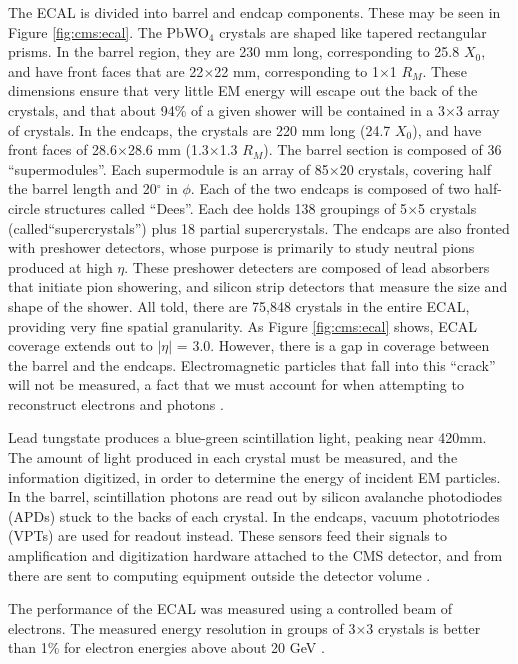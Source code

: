 The ECAL is divided into barrel and endcap components.
These may be seen in Figure \ref{fig:cms:ecal}.
The PbWO$_4$ crystals are shaped like tapered rectangular prisms. In
the barrel region, they are 230 mm long, corresponding to 25.8 $X_0$,
and have front faces that are 22$\times$22 mm, corresponding to
1$\times$1 $R_M$. These dimensions ensure that very little EM energy
will escape out the back of the crystals, and that
about 94\% of a given shower will be contained in a 3$\times$3 array
of crystals. In the endcaps, the crystals are 220 mm long (24.7 $X_0$),
and have front faces of 28.6$\times$28.6 mm (1.3$\times$1.3 $R_M$).
The barrel section is composed of 36 ``supermodules''. Each
supermodule is an array of 85$\times$20 crystals, covering half the
barrel length and 20$^\circ$ in $\phi$. Each of the two endcaps is
composed of two half-circle structures called ``Dees''. Each dee holds
138 groupings of 5$\times$5 crystals (called``supercrystals'') plus
18 partial supercrystals. The endcaps are also fronted with preshower
detectors, whose purpose is primarily to study neutral pions produced
at high $\eta$. These preshower detecters are composed of lead
absorbers that initiate pion showering, and silicon strip detectors
that measure the size and shape of the shower. All told, there are
75,848 crystals in the entire ECAL, providing very fine spatial
granularity. As Figure \ref{fig:cms:ecal}
shows, ECAL coverage extends out to $|\eta|$ = 3.0. However, there is
a gap in coverage between the barrel and the endcaps. Electromagnetic
particles that fall into this ``crack'' will not be measured, a fact
that we must account for when attempting to reconstruct electrons and
photons \cite{tdr}.

Lead tungstate produces a blue-green scintillation light, peaking near
420mm. The amount of light produced in each crystal must be measured,
and the information digitized, in order to determine the energy of incident EM
particles. In the
barrel, scintillation photons are read out by silicon avalanche photodiodes (APDs)
stuck to the backs of each crystal. In the endcaps, vacuum
phototriodes (VPTs) are used for readout instead. These sensors feed
their signals to amplification and digitization hardware attached to
the CMS detector, and from there are sent to computing equipment
outside the detector volume \cite{tdr}.

The performance of the ECAL was measured using a controlled beam of
electrons. The measured energy resolution in groups of 3$\times$3
crystals is better than 1\% for electron energies above about 20 GeV \cite{tdr}.


